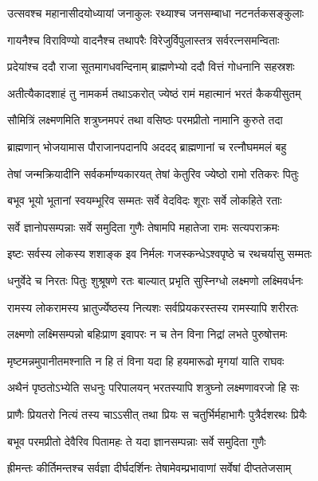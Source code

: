 \twolineshloka
{उत्सवश्च महानासीदयोध्यायां जनाकुलः}
{रथ्याश्च जनसम्बाधा नटनर्तकसङ्कुलाः} %

\twolineshloka
{गायनैश्च विराविण्यो वादनैश्च तथापरैः}
{विरेजुर्विपुलास्तत्र सर्वरत्नसमन्विताः} %

\twolineshloka
{प्रदेयांश्च ददौ राजा सूतमागधवन्दिनाम्}
{ब्राह्मणेभ्यो ददौ वित्तं गोधनानि सहस्रशः} %

\twolineshloka
{अतीत्यैकादशाहं तु नामकर्म तथाऽकरोत्}
{ज्येष्ठं रामं महात्मानं भरतं कैकयीसुतम्} %

\twolineshloka
{सौमित्रिं लक्ष्मणमिति शत्रुघ्नमपरं तथा}
{वसिष्ठः परमप्रीतो नामानि कुरुते तदा} %

\twolineshloka
{ब्राह्मणान् भोजयामास पौराजानपदानपि}
{अददद् ब्राह्मणानां च रत्नौघममलं बहु} %

\twolineshloka
{तेषां जन्मक्रियादीनि सर्वकर्माण्यकारयत्}
{तेषां केतुरिव ज्येष्ठो रामो रतिकरः पितुः} %

\twolineshloka
{बभूव भूयो भूतानां स्वयम्भूरिव सम्मतः}
{सर्वे वेदविदः शूराः सर्वे लोकहिते रताः} %

\twolineshloka
{सर्वे ज्ञानोपसम्पन्नाः सर्वे समुदिता गुणैः}
{तेषामपि महातेजा रामः सत्यपराक्रमः} %

\twolineshloka
{इष्टः सर्वस्य लोकस्य शशाङ्क इव निर्मलः}
{गजस्कन्धेऽश्वपृष्ठे च रथचर्यासु सम्मतः} %

\twolineshloka
{धनुर्वेदे च निरतः पितुः शुश्रूषणे रतः}
{बाल्यात् प्रभृति सुस्निग्धो लक्ष्मणो लक्ष्मिवर्धनः} %

\twolineshloka
{रामस्य लोकरामस्य भ्रातुर्ज्येष्ठस्य नित्यशः}
{सर्वप्रियकरस्तस्य रामस्यापि शरीरतः} %

\twolineshloka
{लक्ष्मणो लक्ष्मिसम्पन्नो बहिःप्राण इवापरः}
{न च तेन विना निद्रां लभते पुरुषोत्तमः} %

\twolineshloka
{मृष्टमन्नमुपानीतमश्नाति न हि तं विना}
{यदा हि हयमारूढो मृगयां याति राघवः} %

\twolineshloka
{अथैनं पृष्ठतोऽभ्येति सधनुः परिपालयन्}
{भरतस्यापि शत्रुघ्नो लक्ष्मणावरजो हि सः} %

\twolineshloka
{प्राणैः प्रियतरो नित्यं तस्य चाऽऽसीत् तथा प्रियः}
{स चतुर्भिर्महाभागैः पुत्रैर्दशरथः प्रियैः} %

\twolineshloka
{बभूव परमप्रीतो देवैरिव पितामहः}
{ते यदा ज्ञानसम्पन्नाः सर्वे समुदिता गुणैः} %

\twolineshloka
{ह्रीमन्तः कीर्तिमन्तश्च सर्वज्ञा दीर्घदर्शिनः}
{तेषामेवम्प्रभावाणां सर्वेषां दीप्ततेजसाम्} %

